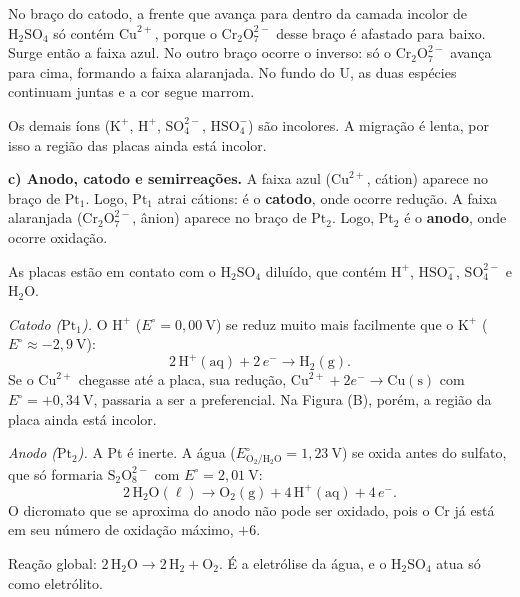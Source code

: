 \documentclass{article}%
\begin{document}
No braço do catodo, a frente que avança para dentro da camada incolor de $\text{H}_2\text{SO}_4$ só contém $\text{Cu}^{2+}$, porque o $\text{Cr}_2\text{O}_7^{2-}$ desse braço é afastado para baixo. Surge então a faixa azul. No outro braço ocorre o inverso: só o $\text{Cr}_2\text{O}_7^{2-}$ avança para cima, formando a faixa alaranjada. No fundo do U, as duas espécies continuam juntas e a cor segue marrom.

Os demais íons ($\text{K}^{+}$, $\text{H}^{+}$, $\text{SO}_4^{2-}$, $\text{HSO}_4^{-}$) são incolores. A migração é lenta, por isso a região das placas ainda está incolor.

\medskip
\textbf{c) Anodo, catodo e semirreações.}
A faixa azul ($\text{Cu}^{2+}$, cátion) aparece no braço de $\text{Pt}_1$. Logo, $\text{Pt}_1$ atrai cátions: é o \textbf{catodo}, onde ocorre redução. A faixa alaranjada ($\text{Cr}_2\text{O}_7^{2-}$, ânion) aparece no braço de $\text{Pt}_2$. Logo, $\text{Pt}_2$ é o \textbf{anodo}, onde ocorre oxidação.

As placas estão em contato com o $\text{H}_2\text{SO}_4$ diluído, que contém $\text{H}^{+}$, $\text{HSO}_4^{-}$, $\text{SO}_4^{2-}$ e $\text{H}_2\text{O}$.

\emph{Catodo ($\text{Pt}_1$).} O $\text{H}^{+}$ ($E^\circ = 0{,}00\ \text{V}$) se reduz muito mais facilmente que o $\text{K}^{+}$ ($E^\circ \approx -2{,}9\ \text{V}$):
\[
2\,\text{H}^{+}(\text{aq}) + 2\,e^{-} \rightarrow \text{H}_2(\text{g}).
\]
Se o $\text{Cu}^{2+}$ chegasse até a placa, sua redução, $\text{Cu}^{2+} + 2e^{-} \rightarrow \text{Cu}(\text{s})$ com $E^\circ = +0{,}34\ \text{V}$, passaria a ser a preferencial. Na Figura (B), porém, a região da placa ainda está incolor.

\emph{Anodo ($\text{Pt}_2$).} A Pt é inerte. A água ($E^\circ_{\text{O}_2/\text{H}_2\text{O}} = 1{,}23\ \text{V}$) se oxida antes do sulfato, que só formaria $\text{S}_2\text{O}_8^{2-}$ com $E^\circ = 2{,}01\ \text{V}$:
\[
2\,\text{H}_2\text{O}(\ell) \rightarrow \text{O}_2(\text{g}) + 4\,\text{H}^{+}(\text{aq}) + 4\,e^{-}.
\]
O dicromato que se aproxima do anodo não pode ser oxidado, pois o Cr já está em seu número de oxidação máximo, $+6$.

Reação global: $2\,\text{H}_2\text{O} \rightarrow 2\,\text{H}_2 + \text{O}_2$. É a eletrólise da água, e o $\text{H}_2\text{SO}_4$ atua só como eletrólito.
\end{document}
